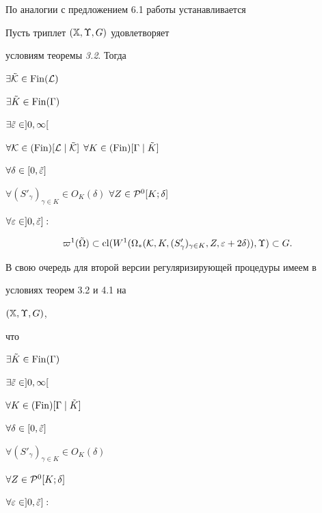 %


По аналогии с предложением 6.1 работы \cite{Ch7} устанавливается





\begin{thms} Пусть триплет $({\Bbb X}, \Upsilon, G)$ удовлетворяет


условиям теоремы {\em 3.2}. Тогда


$\exists\tilde {\cal K} \in \operatorname{Fin}({\cal L})$


$\exists\tilde K \in \operatorname{Fin}(\Gamma)$


$\exists\tilde{\varepsilon} \in ]0,\infty[$


$\forall {\cal K} \in (\Fin)[{\cal L}\mid \tilde{\cal K}]$ $\forall K


  \in (\Fin)[\Gamma\mid\tilde K]$


$\forall\delta \in [0,\tilde{\varepsilon}]$


$\forall (S'_\gamma)_{\gamma \in K} \in O_K(\delta)$ $\forall Z \in


  {\cal P}^0[K; \delta]$


$\forall\varepsilon \in ]0, \tilde{\varepsilon}]:$


\begin{equation}


\varpi^1(\tilde\Omega) \subset \cl(W^1(\Omega_*({\cal K}, K,


(S'_\gamma)_{\gamma \in K}, Z, \var + 2\delta)), \Upsilon) \subset G.


\end{equation}


\end{thms}





В свою очередь для второй версии регуляризирующей процедуры имеем в


условиях теорем 3.2 и 4.1 на


$({\Bbb X}, \Upsilon, G)$,


что


$\exists\tilde K \in \operatorname{Fin}(\Gamma)$


$\exists\tilde{\varepsilon} \in ]0,\infty[$


$\forall K \in (\operatorname{Fin})[\Gamma\mid\tilde K]$


$\forall\delta \in [0, \tilde{\varepsilon}]$


$\forall (S'_\gamma)_{\gamma \in K} \in O_K(\delta)$


$\forall Z \in {\cal P}^0[K; \delta]$


$\forall\varepsilon \in ]0, \tilde{\varepsilon}]:$


